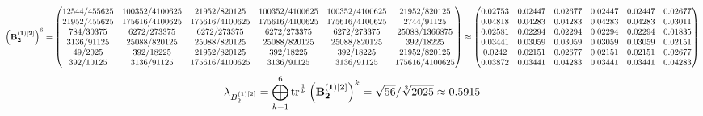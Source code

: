 \documentclass[10pt,a4paper]{article}
\begin{document}
	\[
		\left(\bold{B_2^{(1)[2]}}\right)^{6} = 
		\begin{pmatrix}
			{{12544}} / {{455625}} & {{100352}} / {{4100625}} & {{21952}} / {{820125}} & {{100352}} / {{4100625}} & {{100352}} / {{4100625}} & {{21952}} / {{820125}} \\
			{{21952}} / {{455625}} & {{175616}} / {{4100625}} & {{175616}} / {{4100625}} & {{175616}} / {{4100625}} & {{175616}} / {{4100625}} & {{2744}} / {{91125}} \\
			{{784}} / {{30375}} & {{6272}} / {{273375}} & {{6272}} / {{273375}} & {{6272}} / {{273375}} & {{6272}} / {{273375}} & {{25088}} / {{1366875}} \\
			{{3136}} / {{91125}} & {{25088}} / {{820125}} & {{25088}} / {{820125}} & {{25088}} / {{820125}} & {{25088}} / {{820125}} & {{392}} / {{18225}} \\
			{{49}} / {{2025}} & {{392}} / {{18225}} & {{21952}} / {{820125}} & {{392}} / {{18225}} & {{392}} / {{18225}} & {{21952}} / {{820125}} \\
			{{392}} / {{10125}} & {{3136}} / {{91125}} & {{175616}} / {{4100625}} & {{3136}} / {{91125}} & {{3136}} / {{91125}} & {{175616}} / {{4100625}} \\
		\end{pmatrix}
		\approx
		\begin{pmatrix}
			0.02753  & 0.02447  & 0.02677  & 0.02447  & 0.02447  & 0.02677  \\
			0.04818  & 0.04283  & 0.04283  & 0.04283  & 0.04283  & 0.03011  \\
			0.02581  & 0.02294  & 0.02294  & 0.02294  & 0.02294  & 0.01835  \\
			0.03441  & 0.03059  & 0.03059  & 0.03059  & 0.03059  & 0.02151  \\
			0.0242   & 0.02151  & 0.02677  & 0.02151  & 0.02151  & 0.02677  \\
			0.03872  & 0.03441  & 0.04283  & 0.03441  & 0.03441  & 0.04283  \\
		\end{pmatrix}
	\]
	\[
		\lambda_{B_2^{(1)[2]}} =  \bigoplus ^{6} _{k = 1} \operatorname{tr} ^{\frac 1 k} \left( \bold{B_2^{(1)[2]}} \right)^k = {\sqrt{56}} / {\sqrt[3]{2025}}\approx 0.5915
	\]
\end{document}
